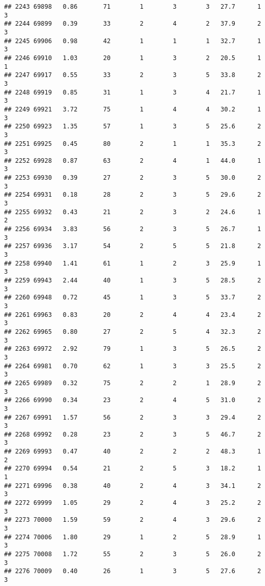 \documentclass[
]{article}
\begin{document}
\begin{verbatim}
## 2243 69898   0.86       71        1        3        3   27.7      1      3
## 2244 69899   0.39       33        2        4        2   37.9      2      3
## 2245 69906   0.98       42        1        1        1   32.7      1      3
## 2246 69910   1.03       20        1        3        2   20.5      1      1
## 2247 69917   0.55       33        2        3        5   33.8      2      3
## 2248 69919   0.85       31        1        3        4   21.7      1      3
## 2249 69921   3.72       75        1        4        4   30.2      1      3
## 2250 69923   1.35       57        1        3        5   25.6      2      3
## 2251 69925   0.45       80        2        1        1   35.3      2      3
## 2252 69928   0.87       63        2        4        1   44.0      1      3
## 2253 69930   0.39       27        2        3        5   30.0      2      3
## 2254 69931   0.18       28        2        3        5   29.6      2      3
## 2255 69932   0.43       21        2        3        2   24.6      1      2
## 2256 69934   3.83       56        2        3        5   26.7      1      3
## 2257 69936   3.17       54        2        5        5   21.8      2      3
## 2258 69940   1.41       61        1        2        3   25.9      1      3
## 2259 69943   2.44       40        1        3        5   28.5      2      3
## 2260 69948   0.72       45        1        3        5   33.7      2      3
## 2261 69963   0.83       20        2        4        4   23.4      2      3
## 2262 69965   0.80       27        2        5        4   32.3      2      3
## 2263 69972   2.92       79        1        3        5   26.5      2      3
## 2264 69981   0.70       62        1        3        3   25.5      2      3
## 2265 69989   0.32       75        2        2        1   28.9      2      3
## 2266 69990   0.34       23        2        4        5   31.0      2      3
## 2267 69991   1.57       56        2        3        3   29.4      2      3
## 2268 69992   0.28       23        2        3        5   46.7      2      3
## 2269 69993   0.47       40        2        2        2   48.3      1      2
## 2270 69994   0.54       21        2        5        3   18.2      1      1
## 2271 69996   0.38       40        2        4        3   34.1      2      3
## 2272 69999   1.05       29        2        4        3   25.2      2      3
## 2273 70000   1.59       59        2        4        3   29.6      2      3
## 2274 70006   1.80       29        1        2        5   28.9      1      3
## 2275 70008   1.72       55        2        3        5   26.0      2      3
## 2276 70009   0.40       26        1        3        5   27.6      2      3

\end{verbatim}
\end{document}
